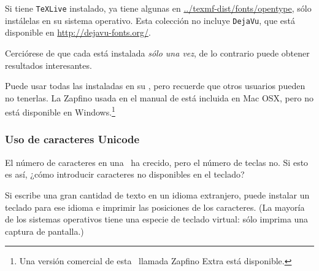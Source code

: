 Si tiene \texttt{TeXLive} instalado, ya tiene algunas en \url{../texmf-dist/fonts/opentype}, sólo instálelas en su sistema operativo.
Esta colección no incluye \texttt{DejaVu}, que está disponible en
\url{http://dejavu-fonts.org/}.


Cerciórese de que cada \fontnomo{} está instalada \emph{sólo una vez}, 
de lo contrario puede obtener resultados interesantes.


Puede usar todas las \fontsnomo{} instaladas en su \computernomo, 
pero recuerde que otros usuarios pueden no tenerlas.
La \fontnomo{} Zapfino usada en el manual de  está incluida
en Mac OSX, pero no está disponible en Windows.\footnote{Una versión comercial de esta \fontnomo\ llamada Zapfino Extra está disponible.}

\subsubsection{Uso de caracteres Unicode}%


El número de caracteres en una \fontnomo\ ha crecido, pero el número de teclas no. Si esto es así, ¿cómo introducir caracteres no disponibles en el teclado?


Si escribe una gran cantidad de texto en un idioma extranjero, puede instalar un teclado para ese idioma e imprimir las posiciones de los caracteres. (La mayoría de los sistemas operativos tiene una especie de teclado virtual: sólo imprima una captura de pantalla.)

